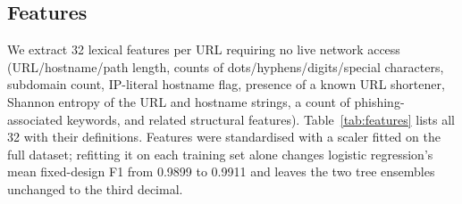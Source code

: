 \documentclass[10pt, a4paper, oneside]{article}
\begin{document}
\subsection{Features}
We extract 32 lexical features per URL requiring no live network access (URL/hostname/path length, counts of dots/hyphens/digits/special characters, subdomain count, IP-literal hostname flag, presence of a known URL shortener, Shannon entropy of the URL and hostname strings, a count of phishing-associated keywords, and related structural features). Table~\ref{tab:features} lists all 32 with their definitions. Features were standardised with a scaler fitted on the full dataset; refitting it on each training set alone changes logistic regression's mean fixed-design F1 from 0.9899 to 0.9911 and leaves the two tree ensembles unchanged to the third decimal.
\end{document}

